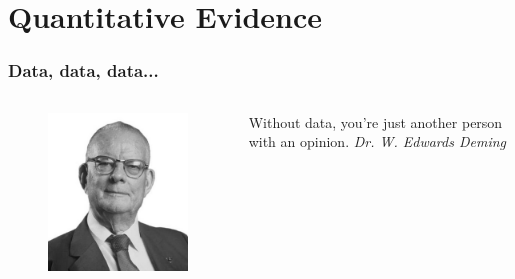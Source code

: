 \documentclass{beamer}
\begin{document}
\section{Quantitative Evidence}
\begin{frame}
\frametitle{\large Data, data, data...}
 \begin{columns}
    \begin{column}{0.37\textwidth}
    \begin{figure}
      \includegraphics[width=\textwidth]{img/edward_deming.png}
     \end{figure}
     
    \end{column}
    \begin{column}{0.55\textwidth}  %
    \hspace{-0.1cm}
    \centering\Large Without data, you're just another person with an opinion.\newline\newline
     \centering\small\textit{Dr. W. Edwards Deming}
\end{column}
\end{columns}
\end{frame}
\fi
\end{document}
